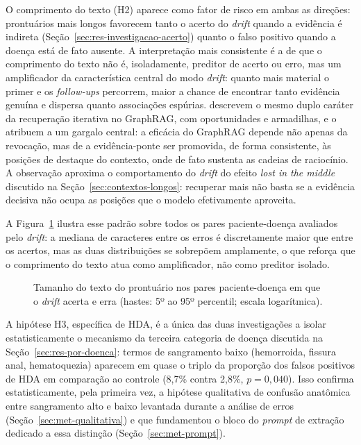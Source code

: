 O comprimento do texto (H2) aparece como fator de risco em ambas as direções: prontuários mais longos favorecem tanto o acerto do \textit{drift} quando a evidência é indireta (Seção~\ref{sec:res-investigacao-acerto}) quanto o falso positivo quando a doença está de fato ausente. A interpretação mais consistente é a de que o comprimento do texto não é, isoladamente, preditor de acerto ou erro, mas um amplificador da característica central do modo \textit{drift}: quanto mais material o primer e os \textit{follow-ups} percorrem, maior a chance de encontrar tanto evidência genuína e dispersa quanto associações espúrias. \citet{guo2026} descrevem o mesmo duplo caráter da recuperação iterativa no GraphRAG, com oportunidades e armadilhas, e o atribuem a um gargalo central: a eficácia do GraphRAG depende não apenas da revocação, mas de a evidência-ponte ser promovida, de forma consistente, às posições de destaque do contexto, onde de fato sustenta as cadeias de raciocínio. A observação aproxima o comportamento do \textit{drift} do efeito \textit{lost in the middle} discutido na Seção~\ref{sec:contextos-longos}: recuperar mais não basta se a evidência decisiva não ocupa as posições que o modelo efetivamente aproveita.

A Figura~\ref{fig:res-acerto-erro-tamanho} ilustra esse padrão sobre todos os pares paciente-doença avaliados pelo \textit{drift}: a mediana de caracteres entre os erros é discretamente maior que entre os acertos, mas as duas distribuições se sobrepõem amplamente, o que reforça que o comprimento do texto atua como amplificador, não como preditor isolado.

\begin{figure}[!htbp]
\centering

\caption[Acerto e erro do \textit{drift} por tamanho do prontuário]{Tamanho do texto do prontuário nos pares paciente-doença em que o \textit{drift} acerta e erra (hastes: 5º ao 95º percentil; escala logarítmica).}
\label{fig:res-acerto-erro-tamanho}
\par{}
\end{figure}

A hipótese H3, específica de HDA, é a única das duas investigações a isolar estatisticamente o mecanismo da terceira categoria de doença discutida na Seção~\ref{sec:res-por-doenca}: termos de sangramento baixo (hemorroida, fissura anal, hematoquezia) aparecem em quase o triplo da proporção dos falsos positivos de HDA em comparação ao controle (8,7\% contra 2,8\%, $p=0,040$). Isso confirma estatisticamente, pela primeira vez, a hipótese qualitativa de confusão anatômica entre sangramento alto e baixo levantada durante a análise de erros (Seção~\ref{sec:met-qualitativa}) e que fundamentou o bloco do \textit{prompt} de extração dedicado a essa distinção (Seção~\ref{sec:met-prompt}).

